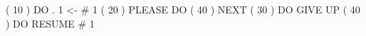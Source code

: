 \begin{CodeBlock}
( 10 ) DO . 1 <- # 1
( 20 ) PLEASE DO ( 40 ) NEXT
( 30 ) DO GIVE UP
( 40 ) DO RESUME # 1
\end{CodeBlock}
